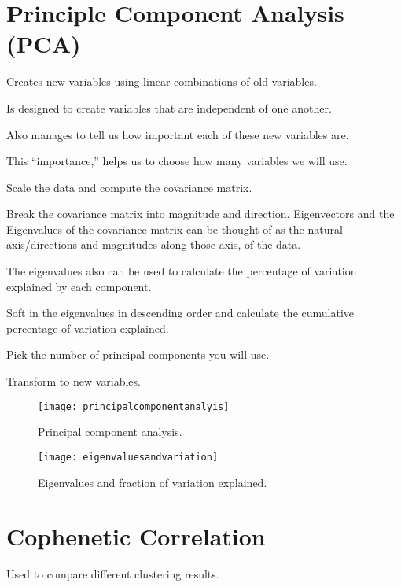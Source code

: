 	\section{Principle Component Analysis (PCA)}
	\begin{bulletedlist}
		\item Creates new variables using linear combinations of old variables.
		\item Is designed to create variables that are independent of one another.
		\item Also manages to tell us how important each of these new variables are.
		\item This ``importance,'' helps us to choose how many variables we will use.
		\item Scale the data and compute the covariance matrix.
		\item Break the covariance matrix into magnitude and direction. Eigenvectors and the Eigenvalues of the covariance matrix can be thought of as the natural axis/directions and magnitudes along those axis, of the data.
		\begin{bulletedlist}
			\item The eigenvalues also can be used to calculate the percentage of variation explained by each component.
		\end{bulletedlist}
		\item Soft in the eigenvalues in descending order and calculate the cumulative percentage of variation explained.
		\item Pick the number of principal components you will use.
		\item Transform to new variables.
	\end{bulletedlist}

	\begin{figure}[h]
		\centering
		\texttt{[image: principalcomponentanalyis]}
		\caption[Principal component analysis]{Principal component analysis.}
		\label{fig:principalcomponentanalyis}
	\end{figure}
 	\begin{figure}[h]
		\centering
		\texttt{[image: eigenvaluesandvariation]}
		\caption[Eigenvalues and fraction of variation explained]{Eigenvalues and fraction of variation explained.}
		\label{fig:eigenvaluesandvariation}
	\end{figure}

	\section{Cophenetic Correlation}
Used to compare different clustering results.

